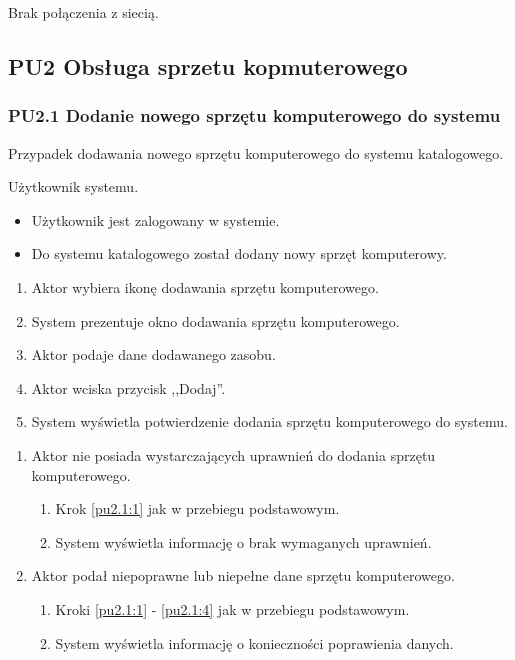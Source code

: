 Brak połączenia z siecią.



\subsection{PU2 Obsługa sprzetu kopmuterowego} \label{pu2}
\subsubsection{PU2.1 Dodanie nowego sprzętu komputerowego do systemu}

Przypadek dodawania nowego sprzętu komputerowego do systemu katalogowego.

Użytkownik systemu.

\begin{itemize}
\item Użytkownik jest zalogowany w systemie.
\end{itemize}

\begin{itemize}
\item Do systemu katalogowego został dodany nowy sprzęt komputerowy.
\end{itemize}

\begin{enumerate}
\item \label{pu2.1:1} Aktor wybiera ikonę dodawania sprzętu komputerowego.
\item System prezentuje okno dodawania sprzętu komputerowego.
\item Aktor podaje dane dodawanego zasobu.
\item \label{pu2.1:4} Aktor wciska przycisk ,,Dodaj''.
\item System wyświetla potwierdzenie dodania sprzętu komputerowego do systemu.
\end{enumerate}

\begin{enumerate}
\item Aktor nie posiada wystarczających uprawnień do dodania sprzętu komputerowego.
	\begin{enumerate}[label*=\arabic*.]
		\item Krok \ref{pu2.1:1} jak w przebiegu podstawowym.
		\item System wyświetla informację o brak wymaganych uprawnień.
	\end{enumerate}
\item Aktor podał niepoprawne lub niepełne dane sprzętu komputerowego.
	\begin{enumerate}[label*=\arabic*.]
		\item Kroki \ref{pu2.1:1} - \ref{pu2.1:4} jak w przebiegu podstawowym.
		\item System wyświetla informację o konieczności poprawienia danych.
	\end{enumerate}
\end{enumerate}

